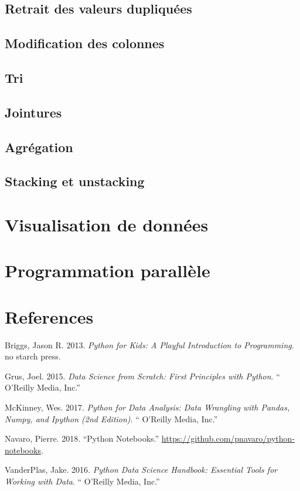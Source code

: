 \documentclass[12pt,]{book}
\numberwithin{equation}{section}
\numberwithin{countremarque}{section}
\begin{document}
\section{Retrait des valeurs
dupliquées}\label{retrait-des-valeurs-dupliquees}

\section{Modification des colonnes}\label{modification-des-colonnes}

\section{Tri}\label{tri-1}

\section{Jointures}\label{jointures}

\section{Agrégation}\label{agregation}

\section{Stacking et unstacking}\label{stacking-et-unstacking}

\chapter{Visualisation de données}\label{visualisation-de-donnees}

\chapter{Programmation parallèle}\label{programmation-parallele}

\chapter{References}\label{references}

\hypertarget{refs}{}
\hypertarget{ref-briggs_2013_python}{}
Briggs, Jason R. 2013. \emph{Python for Kids: A Playful Introduction to
Programming}. no starch press.

\hypertarget{ref-grus_2015_data}{}
Grus, Joel. 2015. \emph{Data Science from Scratch: First Principles with
Python}. `` O'Reilly Media, Inc.''

\hypertarget{ref-mckinney_2017_python}{}
McKinney, Wes. 2017. \emph{Python for Data Analysis: Data Wrangling with
Pandas, Numpy, and Ipython (2nd Edition)}. `` O'Reilly Media, Inc.''

\hypertarget{ref-navaro_python}{}
Navaro, Pierre. 2018. ``Python Notebooks.''
\url{https://github.com/pnavaro/python-notebooks}.

\hypertarget{ref-vanderplas2016python}{}
VanderPlas, Jake. 2016. \emph{Python Data Science Handbook: Essential
Tools for Working with Data}. `` O'Reilly Media, Inc.''
\end{document}
